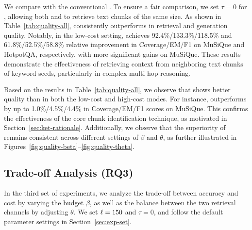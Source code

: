 We compare \keyrag with the conventional \textrag. To ensure a fair comparison, we set $\tau=0$ for \keyrag, allowing both \keyrag and \textrag to retrieve text chunks of the same size. As shown in Table~\ref{tab:quality-all}, \keyrag consistently outperforms \textrag in retrieval and generation quality. Notably, in the low-cost setting, \keyrag achieves 92.4\%/133.3\%/118.5\% and 61.8\%/52.5\%/58.8\% relative improvement in Coverage/EM/F1 on MuSiQue and HotpotQA, respectively, with more significant gains on MuSiQue. These results demonstrate the effectiveness of retrieving context from neighboring text chunks of keyword seeds, particularly in complex multi-hop reasoning.

Based on the results in Table~\ref{tab:quality-all}, we observe that \sketragp shows better quality than \sketragu in both the low-cost and high-cost modes. For instance, \sketragp outperforms \sketragu by up to 1.0\%/4.5\%/4.4\% in Coverage/EM/F1 scores on MuSiQue.
This confirms the effectiveness of the core chunk identification technique, as motivated in Section~\ref{sec:ket-rationale}.
Additionally, we observe that the superiority of \sketragp remains consistent across different settings of $\beta$ and $\theta$, as further illustrated in Figures~\ref{fig:quality-beta}–\ref{fig:quality-theta}.


% 

\subsection{Trade-off Analysis (RQ3)}
In the third set of experiments, we analyze the trade-off between accuracy and cost by varying the budget $\beta$, as well as the balance between the two retrieval channels by adjusting $\theta$. We set $\ell = 150$ and $\tau=0$, and follow the default parameter settings in Section~\ref{sec:exp-set}.

